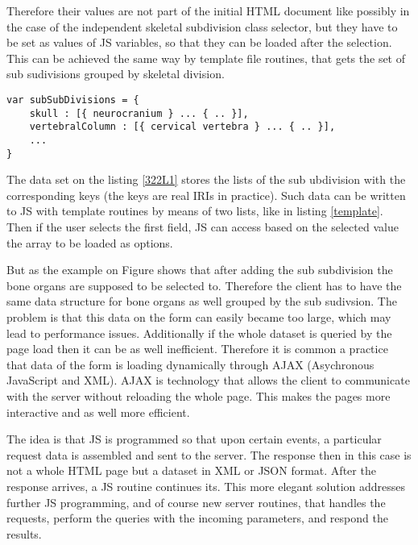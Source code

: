 

Therefore their values are not part of the initial HTML document like possibly in the case of the independent skeletal subdivision class selector, but they have to be set as values of JS variables, so that they can be loaded after the selection. This can be achieved the same way by template file routines, that gets the set of sub sudivisions grouped by skeletal division.

\begin{lstlisting}[captionpos=b, caption= Form option data structure in JSON, label={322L1},
basicstyle=\footnotesize,frame=single]
var subSubDivisions = {
	skull : [{ neurocranium } ... { .. }],
	vertebralColumn : [{ cervical vertebra } ... { .. }],
	...
}
\end{lstlisting}

The data set on the listing \ref{322L1} stores the lists of the sub ubdivision with the corresponding keys (the keys are real IRIs in practice). Such data can be written to JS with template routines by means of two lists, like in listing \ref{template}. Then if the user selects the first field, JS can access based on the selected value the array to be loaded as options.

But as the example on Figure  shows that after adding the sub subdivision the bone organs are supposed to be selected to. Therefore the client has to have the same data structure for bone organs as well grouped by the sub sudivsion. The problem is that this data on the form can easily became too large, which may lead to performance issues. Additionally if the whole dataset is queried by the page load then it can be as well inefficient. Therefore it is common a practice that data of the form is loading dynamically through AJAX (Asychronous JavaScript and XML). AJAX is technology that allows the client to communicate with the server without reloading the whole page. This makes the pages more interactive and as well more efficient.
 

The idea is that JS is programmed so that upon certain events, a particular request data is assembled and sent to the server. The response then in this case is not a whole HTML page but a dataset in XML or JSON format. After the response arrives, a JS routine continues its. This more elegant solution addresses further JS programming, and of course new server routines, that handles the requests, perform the queries with the incoming parameters, and respond the results.


